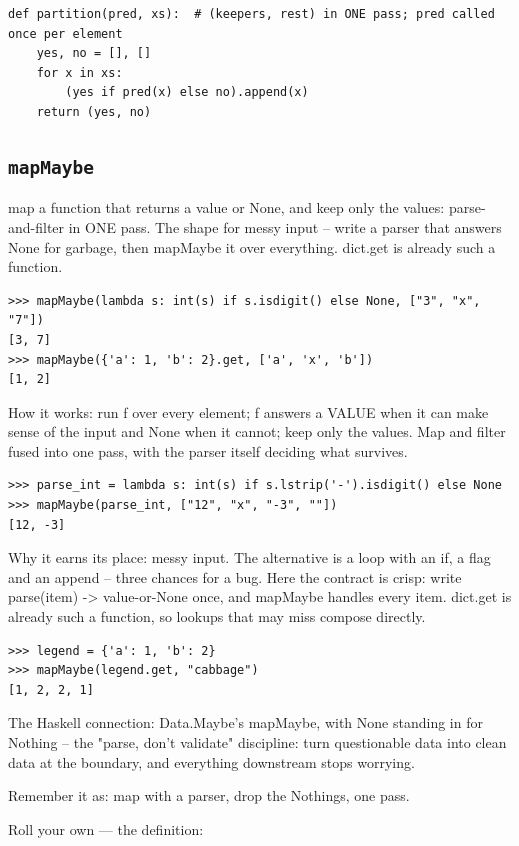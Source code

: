 \documentclass[10pt,letterpaper]{book}
\begin{document}
\begin{lstlisting}[style=ex]
def partition(pred, xs):  # (keepers, rest) in ONE pass; pred called once per element
    yes, no = [], []
    for x in xs:
        (yes if pred(x) else no).append(x)
    return (yes, no)
\end{lstlisting}
\subsection{\texttt{mapMaybe}}\label{def:mapMaybe}
map a function that returns a value or None, and keep only the values: parse-and-filter in ONE pass. The shape for messy input -- write a parser that answers None for garbage, then mapMaybe it over everything. dict.get is already such a function.
\begin{lstlisting}[style=ex]
>>> mapMaybe(lambda s: int(s) if s.isdigit() else None, ["3", "x", "7"])
[3, 7]
>>> mapMaybe({'a': 1, 'b': 2}.get, ['a', 'x', 'b'])
[1, 2]
\end{lstlisting}

How it works: run f over every element; f answers a VALUE when it can make sense of the input and None when it cannot; keep only the values. Map and filter fused into one pass, with the parser itself deciding what survives.

\begin{lstlisting}[style=ex]
>>> parse_int = lambda s: int(s) if s.lstrip('-').isdigit() else None
>>> mapMaybe(parse_int, ["12", "x", "-3", ""])
[12, -3]
\end{lstlisting}

Why it earns its place: messy input. The alternative is a loop with an if, a flag and an append -- three chances for a bug. Here the contract is crisp: write parse(item) -> value-or-None once, and mapMaybe handles every item. dict.get is already such a function, so lookups that may miss compose directly.

\begin{lstlisting}[style=ex]
>>> legend = {'a': 1, 'b': 2}
>>> mapMaybe(legend.get, "cabbage")
[1, 2, 2, 1]
\end{lstlisting}

The Haskell connection: Data.Maybe's mapMaybe, with None standing in for Nothing -- the "parse, don't validate" discipline: turn questionable data into clean data at the boundary, and everything downstream stops worrying.


Remember it as: map with a parser, drop the Nothings, one pass.


Roll your own --- the definition:
\end{document}
